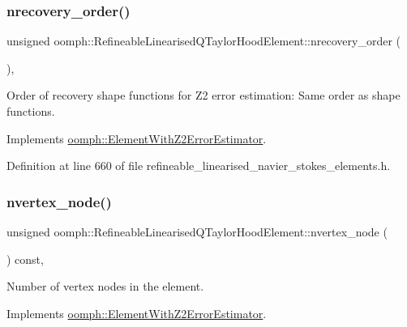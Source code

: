\subsubsection{\texorpdfstring{nrecovery\+\_\+order()}{nrecovery\_order()}}
{\footnotesize\ttfamily unsigned oomph\+::\+Refineable\+Linearised\+Q\+Taylor\+Hood\+Element\+::nrecovery\+\_\+order (\begin{DoxyParamCaption}{ }\end{DoxyParamCaption})\hspace{0.3cm}{\ttfamily [inline]}, {\ttfamily [virtual]}}



Order of recovery shape functions for Z2 error estimation\+: Same order as shape functions. 



Implements \hyperlink{classoomph_1_1ElementWithZ2ErrorEstimator_af39480835bd3e0f6b2f4f7a9a4044798}{oomph\+::\+Element\+With\+Z2\+Error\+Estimator}.



Definition at line 660 of file refineable\+\_\+linearised\+\_\+navier\+\_\+stokes\+\_\+elements.\+h.

\mbox{\label{classoomph_1_1RefineableLinearisedQTaylorHoodElement_ad2f150987cca5fb4d8e64fdec5fe3f65}} 
\subsubsection{\texorpdfstring{nvertex\+\_\+node()}{nvertex\_node()}}
{\footnotesize\ttfamily unsigned oomph\+::\+Refineable\+Linearised\+Q\+Taylor\+Hood\+Element\+::nvertex\+\_\+node (\begin{DoxyParamCaption}{ }\end{DoxyParamCaption}) const\hspace{0.3cm}{\ttfamily [inline]}, {\ttfamily [virtual]}}



Number of vertex nodes in the element. 



Implements \hyperlink{classoomph_1_1ElementWithZ2ErrorEstimator_a19495a0e77ef4ff35f15fdf7913b4077}{oomph\+::\+Element\+With\+Z2\+Error\+Estimator}.



